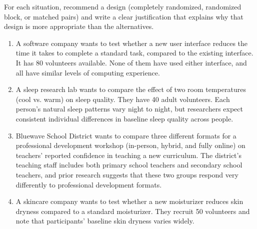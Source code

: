 \begin{Exercise}[title={Justifying a Design Choice}, label={ex:design-choice}]
For each situation, recommend a design (completely randomized, randomized block, or matched pairs) and write a clear justification that explains why that design is more appropriate than the alternatives.

\begin{enumerate} 
    \item A software company wants to test whether a new user interface reduces the time it takes to complete a standard task, compared to the existing interface. It has 80 volunteers available. None of them have used either interface, and all have similar levels of computing experience.

    \item A sleep research lab wants to compare the effect of two room temperatures (cool vs. warm) on sleep quality. They have 40 adult volunteers. Each person's natural sleep patterns vary night to night, but researchers expect consistent individual differences in baseline sleep quality across people.

    \item Bluewave School District wants to compare three different formats for a professional development workshop (in-person, hybrid, and fully online) on teachers' reported confidence in teaching a new curriculum. The district's teaching staff includes both primary school teachers and secondary school teachers, and prior research suggests that these two groups respond very differently to professional development formats.

    \item A skincare company wants to test whether a new moisturizer reduces skin dryness compared to a standard moisturizer. They recruit 50 volunteers and note that participants' baseline skin dryness varies widely.
\end{enumerate}
\end{Exercise}
